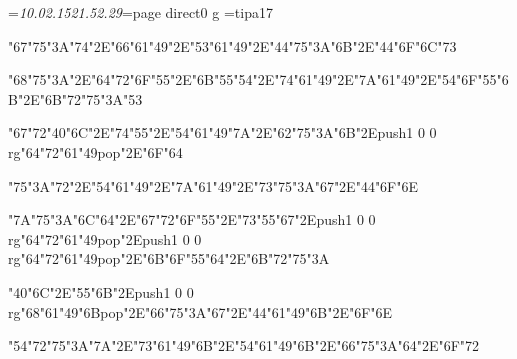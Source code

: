 \footline={\tenrm\it 10.02.15\hfill 21.52.29\hfill\folio}\chardef\match=\pdfcolorstackinit page direct{0 g} \font\ipa=tipa17 \pdfpagewidth 5.5in \pdfpageheight 8.5in \hsize 4.5in \vsize 7in \hoffset -0.5in \voffset -0.375in
\null\vfill
\centerline{\ipa\char"67\ipa\char"75\ipa\char"3A\ipa\char"74\ipa\char"2E\ipa\char"66\ipa\char"61\ipa\char"49\ipa\char"2E\ipa\char"53\ipa\char"61\ipa\char"49\ipa\char"2E\ipa\char"44\ipa\char"75\ipa\char"3A\ipa\char"6B\ipa\char"2E\ipa\char"44\ipa\char"6F\ipa\char"6C\ipa\char"73}\bigskip
\centerline{\ipa\char"68\ipa\char"75\ipa\char"3A\ipa\char"2E\ipa\char"64\ipa\char"72\ipa\char"6F\ipa\char"55\ipa\char"2E\ipa\char"6B\ipa\char"55\ipa\char"54\ipa\char"2E\ipa\char"74\ipa\char"61\ipa\char"49\ipa\char"2E\ipa\char"7A\ipa\char"61\ipa\char"49\ipa\char"2E\ipa\char"54\ipa\char"6F\ipa\char"55\ipa\char"6B\ipa\char"2E\ipa\char"6B\ipa\char"72\ipa\char"75\ipa\char"3A\ipa\char"53}\bigskip
\centerline{\ipa\char"67\ipa\char"72\ipa\char"40\ipa\char"6C\ipa\char"2E\ipa\char"74\ipa\char"55\ipa\char"2E\ipa\char"54\ipa\char"61\ipa\char"49\ipa\char"7A\ipa\char"2E\ipa\char"62\ipa\char"75\ipa\char"3A\ipa\char"6B\ipa\char"2E\pdfcolorstack\match push{1 0 0 rg}\ipa\char"64\ipa\char"72\ipa\char"61\ipa\char"49\pdfcolorstack\match pop{}\ipa\char"2E\ipa\char"6F\ipa\char"64}\vfill\eject
\null\vfill
\centerline{\ipa\char"75\ipa\char"3A\ipa\char"72\ipa\char"2E\ipa\char"54\ipa\char"61\ipa\char"49\ipa\char"2E\ipa\char"7A\ipa\char"61\ipa\char"49\ipa\char"2E\ipa\char"73\ipa\char"75\ipa\char"3A\ipa\char"67\ipa\char"2E\ipa\char"44\ipa\char"6F\ipa\char"6E}\bigskip
\centerline{\ipa\char"7A\ipa\char"75\ipa\char"3A\ipa\char"6C\ipa\char"64\ipa\char"2E\ipa\char"67\ipa\char"72\ipa\char"6F\ipa\char"55\ipa\char"2E\ipa\char"73\ipa\char"55\ipa\char"67\ipa\char"2E\pdfcolorstack\match push{1 0 0 rg}\ipa\char"64\ipa\char"72\ipa\char"61\ipa\char"49\pdfcolorstack\match pop{}\ipa\char"2E\pdfcolorstack\match push{1 0 0 rg}\ipa\char"64\ipa\char"72\ipa\char"61\ipa\char"49\pdfcolorstack\match pop{}\ipa\char"2E\ipa\char"6B\ipa\char"6F\ipa\char"55\ipa\char"64\ipa\char"2E\ipa\char"6B\ipa\char"72\ipa\char"75\ipa\char"3A}\bigskip
\centerline{\ipa\char"40\ipa\char"6C\ipa\char"2E\ipa\char"55\ipa\char"6B\ipa\char"2E\pdfcolorstack\match push{1 0 0 rg}\ipa\char"68\ipa\char"61\ipa\char"49\ipa\char"6B\pdfcolorstack\match pop{}\ipa\char"2E\ipa\char"66\ipa\char"75\ipa\char"3A\ipa\char"67\ipa\char"2E\ipa\char"44\ipa\char"61\ipa\char"49\ipa\char"6B\ipa\char"2E\ipa\char"6F\ipa\char"6E}\vfill\eject
\null\vfill
\centerline{\ipa\char"54\ipa\char"72\ipa\char"75\ipa\char"3A\ipa\char"7A\ipa\char"2E\ipa\char"73\ipa\char"61\ipa\char"49\ipa\char"6B\ipa\char"2E\ipa\char"54\ipa\char"61\ipa\char"49\ipa\char"6B\ipa\char"2E\ipa\char"66\ipa\char"75\ipa\char"3A\ipa\char"64\ipa\char"2E\ipa\char"6F\ipa\char"72}\bigskip
